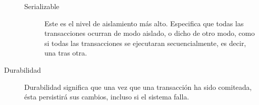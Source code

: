 \begin{description}
\begin{description}
				
		  \item [Serializable]
				Este es el nivel de aislamiento más alto. Especifica que todas las
				transacciones ocurran de modo aislado, o dicho de otro modo, como si todas las
				transacciones se ejecutaran secuencialmente, es decir, una tras otra. 
			
			\end{description}
	  	
	\item[Durabilidad]
		
		Durabilidad significa que una vez que una transacción ha sido comiteada, ésta
		persistirá sus cambios, incluso si el sistema falla.
	
	\end{description}
		
